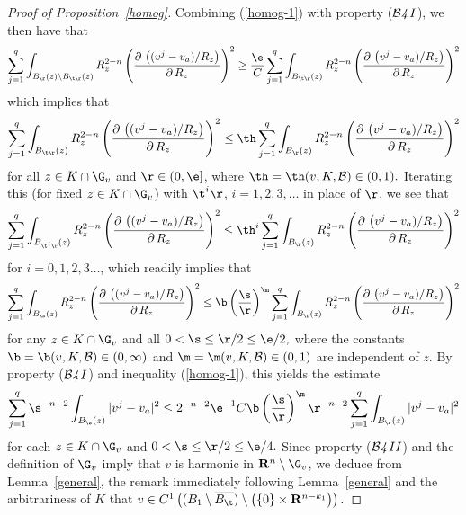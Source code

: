\documentclass[a4paper,11pt]{amsart}
\begin{document}
\begin{proof}[Proof of Proposition~\ref{homog}]
Combining (\ref{homog-1}) with property (${\mathcal B {\emph 4 \, I}}$), we then have that 
$$\sum_{j=1}^{q}\int_{B_{\r}(z) \setminus B_{\t\r}(z)} R_{z}^{2-n} \left(\frac{\partial\, \left((v^{j} - v_{a})/R_{z}\right)}{\partial\, R_{z}}\right)^{2} \geq \frac{\e}{C} \sum_{j=1}^{q}\int_{B_{\t\r}(z)} R_{z}^{2-n} \left(\frac{\partial\, \left(v^{j} - v_{a})/R_{z}\right)}{\partial\, R_{z}}\right)^{2}$$ 
which implies that 
\begin{equation}\label{homog-3}
\sum_{j=1}^{q}\int_{B_{\t\r}(z)} R_{z}^{2-n} \left(\frac{\partial\, \left((v^{j} - v_{a})/R_{z}\right)}{\partial\, R_{z}}\right)^{2} \leq \th \sum_{j=1}^{q}\int_{B_{\r}(z)} R_{z}^{2-n} \left(\frac{\partial\, \left(v^{j} - v_{a})/R_{z}\right)}{\partial\, R_{z}}\right)^{2} 
\end{equation} 
for all $z \in K \cap \G_{v}$  and $\r \in (0,\e]$, where $\th = \th(v, K, {\mathcal B}) \in (0, 1).$ Iterating this (for fixed $z \in K \cap \G_{v}$) with $\t^{i}\r$, $i=1, 2, 3, \ldots$ in place of $\r$, we see that 
$$\sum_{j=1}^{q}\int_{B_{\t^{i}\r}(z)} R_{z}^{2-n} \left(\frac{\partial\, \left((v^{j} - v_{a})/R_{z}\right)}{\partial\, R_{z}}\right)^{2} \leq \th^{i}\sum_{j=1}^{q}\int_{B_{\r}(z)} R_{z}^{2-n} \left(\frac{\partial\, \left(v^{j} - v_{a})/R_{z}\right)}{\partial\, R_{z}}\right)^{2}$$ 
for $i=0, 1, 2, 3 \ldots$, which readily implies that 
$$\sum_{j=1}^{q}\int_{B_{\s}(z)} R_{z}^{2-n} \left(\frac{\partial\, \left((v^{j} - v_{a})/R_{z}\right)}{\partial\, R_{z}}\right)^{2} \leq \b\left(\frac{\s}{\r}\right)^{\m}\sum_{j=1}^{q}\int_{B_{\r}(z)} R_{z}^{2-n} \left(\frac{\partial\, \left(v^{j} - v_{a})/R_{z}\right)}{\partial\, R_{z}}\right)^{2}$$ 
for any $z \in K \cap \G_{v}$ and all $0 <\s \leq \r/2 \leq \e/2,$ where the constants $\b = \b(v, K, {\mathcal B}) \in (0, \infty)$ and $\m = \m(v, K, {\mathcal B}) \in (0, 1)$ are independent of $z$. By property (${\mathcal B{\emph 4 \, I}}$) and inequality 
(\ref{homog-1}), this yields the estimate 
\begin{equation}\label{homog-4}
\sum_{j=1}^{q}\s^{-n-2}\int_{B_{\s}(z)}|v^{j} -v_{a}|^{2} \leq 2^{-n-2}\e^{-1}C\b \left(\frac{\s}{\r}\right)^{\m}\r^{-n-2}\sum_{j=1}^{q}\int_{B_{\r}(z)}|v^{j} - v_{a}|^{2}
\end{equation}
for each $z \in K \cap \G_{v}$ and $0 < \s \leq  \r/2 \leq \e/4.$ Since property (${\mathcal B{\emph 4 \, II}}$) and the definition of $\G_{v}$ imply that $v$ is harmonic in ${\mathbf R}^{n} \setminus \G_{v}$,  we deduce from Lemma~\ref{general}, the remark immediately following Lemma~\ref{general} and the arbitrariness of $K$ that 
$v \in C^{1}\left((B_{1} \setminus \overline{B_{\t}}) \setminus \left(\{0\} \times {\mathbf R}^{n-k_{1}}\right)\right).$ 


\end{proof}
\end{document}
